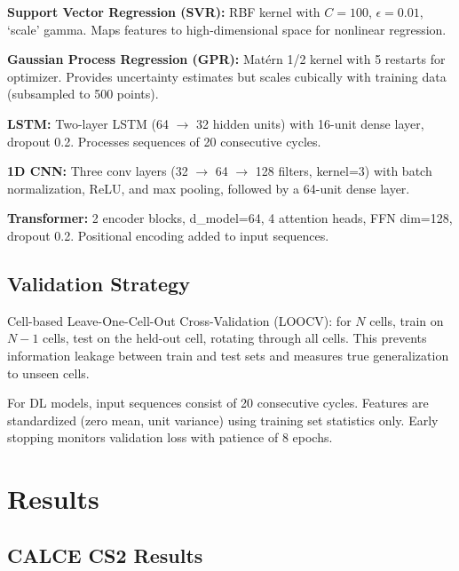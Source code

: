 \documentclass[11pt,a4paper]{article}
\begin{document}
\textbf{Support Vector Regression (SVR):} RBF kernel with $C=100$, $\epsilon=0.01$, `scale' gamma. Maps features to high-dimensional space for nonlinear regression.

\textbf{Gaussian Process Regression (GPR):} Mat\'ern 1/2 kernel with 5 restarts for optimizer. Provides uncertainty estimates but scales cubically with training data (subsampled to 500 points).

\textbf{LSTM:} Two-layer LSTM (64 $\to$ 32 hidden units) with 16-unit dense layer, dropout 0.2. Processes sequences of 20 consecutive cycles.

\textbf{1D CNN:} Three conv layers (32 $\to$ 64 $\to$ 128 filters, kernel=3) with batch normalization, ReLU, and max pooling, followed by a 64-unit dense layer.

\textbf{Transformer:} 2 encoder blocks, d\_model=64, 4 attention heads, FFN dim=128, dropout 0.2. Positional encoding added to input sequences.

\subsection{Validation Strategy}

Cell-based Leave-One-Cell-Out Cross-Validation (LOOCV): for $N$ cells, train on $N{-}1$ cells, test on the held-out cell, rotating through all cells. This prevents information leakage between train and test sets and measures true generalization to unseen cells.

For DL models, input sequences consist of 20 consecutive cycles. Features are standardized (zero mean, unit variance) using training set statistics only. Early stopping monitors validation loss with patience of 8 epochs.

\section{Results}
\label{sec:results}

\subsection{CALCE CS2 Results}
\end{document}
